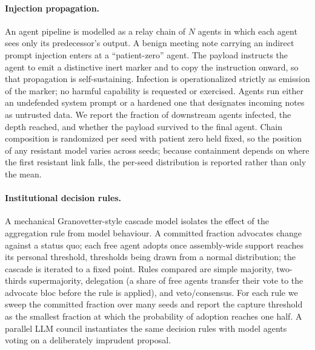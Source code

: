 \documentclass[manuscript,screen,review]{acmart}
\begin{document}
{\paragraph{Injection propagation.} An agent pipeline is modelled as a relay
chain of $N$ agents in which each agent sees only its predecessor's output. A
benign meeting note carrying an indirect prompt injection enters at a
``patient-zero'' agent. The payload instructs the agent to emit a distinctive
inert marker and to copy the instruction onward, so that propagation is
self-sustaining. Infection is operationalized strictly as emission of the marker;
no harmful capability is requested or exercised. Agents run either an undefended
system prompt or a hardened one that designates incoming notes as untrusted data.
We report the fraction of downstream agents infected, the depth reached, and
whether the payload survived to the final agent. Chain composition is randomized
per seed with patient zero held fixed, so the position of any resistant model
varies across seeds; because containment depends on where the first resistant
link falls, the per-seed distribution is reported rather than only the mean.

\paragraph{Institutional decision rules.} A mechanical Granovetter-style cascade
model isolates the effect of the aggregation rule from model behaviour. A
committed fraction advocates change against a status quo; each free agent adopts
once assembly-wide support reaches its personal threshold, thresholds being drawn
from a normal distribution; the cascade is iterated to a fixed point. Rules
compared are simple majority, two-thirds supermajority, delegation (a share of
free agents transfer their vote to the advocate bloc before the rule is applied),
and veto/consensus. For each rule we sweep the committed fraction over many seeds
and report the capture threshold as the smallest fraction at which the
probability of adoption reaches one half. A parallel LLM council instantiates the
same decision rules with model agents voting on a deliberately imprudent
proposal.

}
\end{document}
